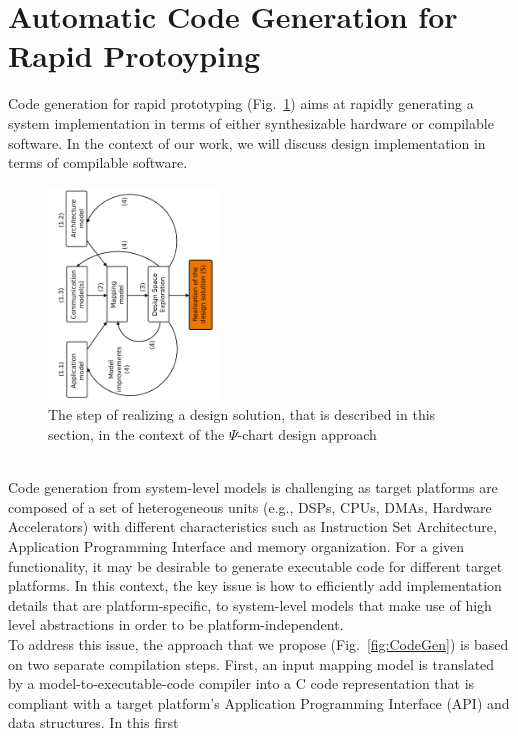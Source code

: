 \documentclass{llncs}
\begin{document}
\section{Automatic Code Generation for Rapid Protoyping}
\label{sec:CodeGen}
%
Code generation for rapid prototyping (Fig.~\ref{fig:PsiChartReal}) aims at
rapidly generating a system implementation in terms of either synthesizable hardware or compilable software. In the context of our work, we will discuss design
implementation in terms of compilable software.
%
\begin{figure}[htbp]
	\centering
	\includegraphics[angle=-90,origin=c,width=0.4\textwidth]{figures/PsiChartReal.pdf}
	\caption{The step of realizing a design solution, that is described in this section, in the context of the
	$\Psi$-chart design approach}
	\label{fig:PsiChartReal}
\end{figure}
%
\\Code generation from system-level models is challenging as target platforms are composed of a set of heterogeneous
units (e.g., DSPs, CPUs, DMAs, Hardware Accelerators) with different characteristics such as Instruction Set
Architecture, Application Programming Interface and memory organization. For a given functionality, it may be desirable
to generate executable code for different target platforms. In this context, the key issue is how to efficiently add
implementation details that are platform-specific, to system-level models that make use of high level abstractions in
order to be platform-independent.\\
%
To address this issue, the approach that we propose (Fig.~\ref{fig:CodeGen}) is
based on two separate compilation steps.
First, an input mapping model is translated by a model-to-executable-code compiler into a C code representation that is
compliant with a target platform's Application Programming Interface (API) and data structures. In this first
\end{document}
